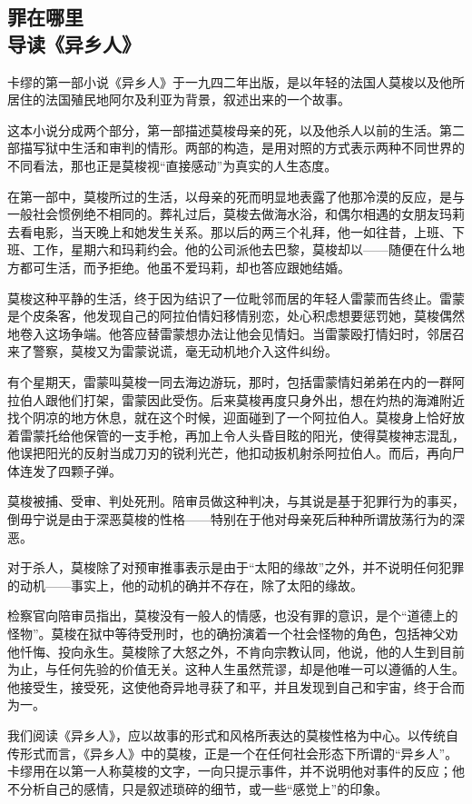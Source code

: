 \subsection{罪在哪里\\\small{导读《异乡人》}}

\par 卡缪的第一部小说《异乡人》于一九四二年出版，是以年轻的法国人莫梭以及他所居住的法国殖民地阿尔及利亚为背景，叙述出来的一个故事。
\par 这本小说分成两个部分，第一部描述莫梭母亲的死，以及他杀人以前的生活。第二部描写狱中生活和审判的情形。两部的构造，是用对照的方式表示两种不同世界的不同看法，那也正是莫梭视“直接感动”为真实的人生态度。
\par 在第一部中，莫梭所过的生活，以母亲的死而明显地表露了他那冷漠的反应，是与一般社会惯例绝不相同的。葬礼过后，莫梭去做海水浴，和偶尔相遇的女朋友玛莉去看电影，当天晚上和她发生关系。那以后的两三个礼拜，他一如往昔，上班、下班、工作，星期六和玛莉约会。他的公司派他去巴黎，莫梭却以——随便在什么地方都可生活，而予拒绝。他虽不爱玛莉，却也答应跟她结婚。
\par 莫梭这种平静的生活，终于因为结识了一位毗邻而居的年轻人雷蒙而告终止。雷蒙是个皮条客，他发现自己的阿拉伯情妇移情别恋，处心积虑想要惩罚她，莫梭偶然地卷入这场争端。他答应替雷蒙想办法让他会见情妇。当雷蒙殴打情妇时，邻居召来了警察，莫梭又为雷蒙说谎，毫无动机地介入这件纠纷。
\par 有个星期天，雷蒙叫莫梭一同去海边游玩，那时，包括雷蒙情妇弟弟在内的一群阿拉伯人跟他们打架，雷蒙因此受伤。后来莫梭再度只身外出，想在灼热的海滩附近找个阴凉的地方休息，就在这个时候，迎面碰到了一个阿拉伯人。莫梭身上恰好放着雷蒙托给他保管的一支手枪，再加上令人头昏目眩的阳光，使得莫梭神志混乱，他误把阳光的反射当成刀刃的锐利光芒，他扣动扳机射杀阿拉伯人。而后，再向尸体连发了四颗子弹。
\par 莫梭被捕、受审、判处死刑。陪审员做这种判决，与其说是基于犯罪行为的事买，倒毋宁说是由于深恶莫梭的性格——特别在于他对母亲死后种种所谓放荡行为的深恶。
\par 对于杀人，莫梭除了对预审推事表示是由于“太阳的缘故”之外，并不说明任何犯罪的动机——事实上，他的动机的确并不存在，除了太阳的缘故。
\par 检察官向陪审员指出，莫梭没有一般人的情感，也没有罪的意识，是个“道德上的怪物”。莫梭在狱中等待受刑时，也的确扮演着一个社会怪物的角色，包括神父劝他忏悔、投向永生。莫梭除了大怒之外，不肯向宗教认同，他说，他的人生到目前为止，与任何先验的价值无关。这种人生虽然荒谬，却是他唯一可以遵循的人生。他接受生，接受死，这使他奇异地寻获了和平，并且发现到自己和宇宙，终于合而为一。
\par 我们阅读《异乡人》，应以故事的形式和风格所表达的莫梭性格为中心。以传统自传形式而言，《异乡人》中的莫梭，正是一个在任何社会形态下所谓的“异乡人”。卡缪用在以第一人称莫梭的文字，一向只提示事件，并不说明他对事件的反应；他不分析自己的感情，只是叙述琐碎的细节，或一些“感觉上”的印象。
